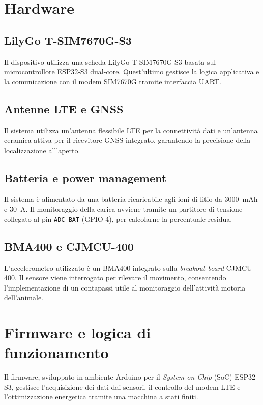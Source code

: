 \documentclass[12pt,a4paper]{article}
\begin{document}
\clearpage
\section{Hardware}
\label{sec:hardware}

\subsection{LilyGo T-SIM7670G-S3}

Il dispositivo utilizza una scheda LilyGo T-SIM7670G-S3 \cite{lilygo_specs} basata sul microcontrollore ESP32-S3 dual-core.
Quest'ultimo gestisce la logica applicativa e la comunicazione con il modem SIM7670G tramite interfaccia UART.

\subsection{Antenne LTE e GNSS}

Il sistema utilizza un'antenna flessibile LTE \cite{LTE} per la connettività dati e un'antenna ceramica attiva \cite{GPS} per il ricevitore GNSS integrato, garantendo la precisione della localizzazione all'aperto.

\subsection{Batteria e power management}

Il sistema è alimentato da una batteria ricaricabile agli ioni di litio da 3000~mAh e 30~A. Il monitoraggio della carica avviene tramite un partitore di tensione collegato al pin \texttt{ADC\_BAT} (GPIO 4), per calcolarne la percentuale residua.

\subsection{BMA400 e CJMCU-400}

L'accelerometro utilizzato è un BMA400 \cite{bma400} integrato sulla \textit{breakout board} CJMCU-400. Il sensore viene interrogato per rilevare il movimento, consentendo l'implementazione di un contapassi utile al monitoraggio dell'attività motoria dell'animale.

\section{Firmware e logica di funzionamento}

Il firmware, sviluppato in ambiente Arduino per 
il \textit{System on Chip} (SoC) ESP32-S3, 
gestisce l'acquisizione dei dati dai sensori, 
il controllo del modem LTE e l'ottimizzazione energetica 
tramite una macchina a stati finiti.
\end{document}
